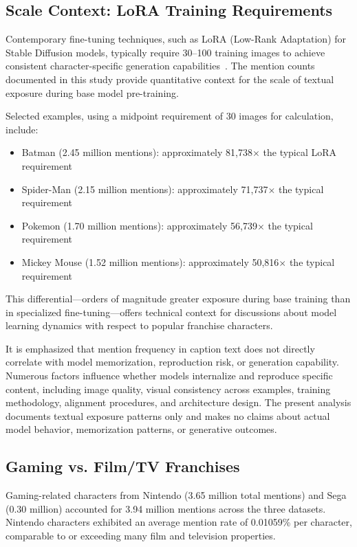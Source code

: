 \documentclass[11pt]{article}
\begin{document}
\subsection{Scale Context: LoRA Training Requirements}
Contemporary fine-tuning techniques, such as LoRA (Low-Rank Adaptation) for Stable Diffusion models, typically require 30--100 training images to achieve consistent character-specific generation capabilities~\citep{hu2021lora}. The mention counts documented in this study provide quantitative context for the scale of textual exposure during base model pre-training.

Selected examples, using a midpoint requirement of 30 images for calculation, include:
\begin{itemize}
\item Batman (2.45 million mentions): approximately 81,738$\times$ the typical LoRA requirement
\item Spider-Man (2.15 million mentions): approximately 71,737$\times$ the typical requirement
\item Pokemon (1.70 million mentions): approximately 56,739$\times$ the typical requirement
\item Mickey Mouse (1.52 million mentions): approximately 50,816$\times$ the typical requirement
\end{itemize}

This differential—orders of magnitude greater exposure during base training than in specialized fine-tuning—offers technical context for discussions about model learning dynamics with respect to popular franchise characters.

It is emphasized that mention frequency in caption text does not directly correlate with model memorization, reproduction risk, or generation capability. Numerous factors influence whether models internalize and reproduce specific content, including image quality, visual consistency across examples, training methodology, alignment procedures, and architecture design. The present analysis documents textual exposure patterns only and makes no claims about actual model behavior, memorization patterns, or generative outcomes.

\subsection{Gaming vs. Film/TV Franchises}
Gaming-related characters from Nintendo (3.65 million total mentions) and Sega (0.30 million) accounted for 3.94 million mentions across the three datasets. Nintendo characters exhibited an average mention rate of 0.01059\% per character, comparable to or exceeding many film and television properties.
\end{document}
